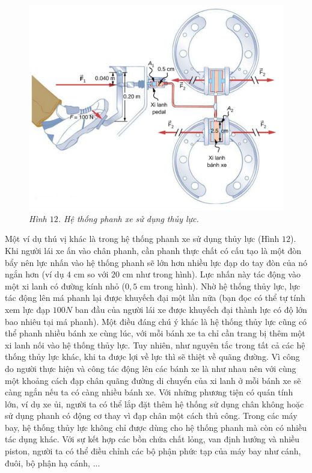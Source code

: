 \begin{multicols}{2}
\begin{figure}[H]
		\includegraphics[width= 1\linewidth]{23}
		\caption{\small\textit{\color{timhieukhoahoc}Hình $12$. Hệ thống phanh xe sử dụng thủy lực.}}
		\vspace*{-10pt}
	\end{figure}
	Một ví dụ thú vị khác là trong hệ thống phanh xe sử dụng thủy lực (Hình $12$). Khi người lái xe ấn vào chân phanh, cần phanh thực chất có cấu tạo là một đòn bẩy nên lực nhấn vào hệ thống phanh sẽ lớn hơn nhiều lực đạp do tay đòn của nó ngắn hơn (ví dụ $4$ cm so với $20$ cm như trong hình). Lực nhấn này tác động vào một xi lanh có đường kính nhỏ ($0,5$ cm trong hình). Nhờ hệ thống thủy lực, lực tác động lên má phanh lại được khuyếch đại một lần nữa (bạn đọc có thể tự tính xem lực đạp $100N$ ban đầu của người lái xe được khuyếch đại thành lực có độ lớn bao nhiêu tại má phanh). Một điều đáng chú ý khác là hệ thống thủy lực cũng có thể phanh nhiều bánh xe cùng lúc, với mỗi bánh xe ta chỉ cần trang bị thêm một xi lanh nối vào hệ thống thủy lực. Tuy nhiên, như nguyên tắc trong tất cả các hệ thống thủy lực khác, khi ta được lợi về lực thì sẽ thiệt về quãng đường. Vì công do người thực hiện và công tác động lên các bánh xe là như nhau nên với cùng một khoảng cách đạp chân quãng đường di chuyển của xi lanh ở mỗi bánh xe sẽ càng ngắn nếu ta có càng nhiều bánh xe. 
	\vskip 0.1cm
	Với những phương tiện có quán tính lớn, ví dụ xe ủi, người ta có thể lắp đặt thêm hệ thống sử dụng chân không hoặc sử dụng phanh có động cơ thay vì đạp chân một cách thủ công. Trong các máy bay, hệ thống thủy lực không chỉ được dùng cho hệ thống phanh mà còn có nhiều tác dụng khác. Với sự kết hợp các bồn chứa chất lỏng, van định hướng và nhiều piston, người ta có thể điều chỉnh các bộ phận phức tạp của máy bay như cánh, đuôi, bộ phận hạ cánh, ...

\end{multicols}
